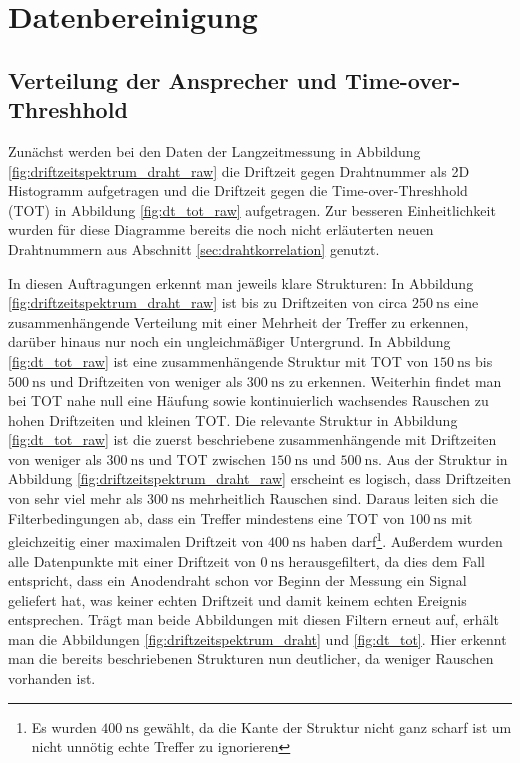 \chapter{Datenbereinigung}

\section{Verteilung der Ansprecher und Time-over-Threshhold}

Zunächst werden bei den Daten der Langzeitmessung in Abbildung \ref{fig:driftzeitspektrum_draht_raw} die Driftzeit gegen Drahtnummer als 2D Histogramm aufgetragen und die Driftzeit gegen die Time-over-Threshhold (TOT) in Abbildung \ref{fig:dt_tot_raw} aufgetragen. Zur besseren Einheitlichkeit wurden für diese Diagramme bereits die noch nicht erläuterten neuen Drahtnummern aus Abschnitt \ref{sec:drahtkorrelation} genutzt.

In diesen Auftragungen erkennt man jeweils klare Strukturen: In Abbildung \ref{fig:driftzeitspektrum_draht_raw} ist bis zu Driftzeiten von circa $\SI{250}{\nano\second}$ eine zusammenhängende Verteilung mit einer Mehrheit der Treffer zu erkennen, darüber hinaus nur noch ein ungleichmäßiger Untergrund. In Abbildung \ref{fig:dt_tot_raw} ist eine zusammenhängende Struktur mit TOT von $\SI{150}{\nano\second}$ bis $\SI{500}{\nano\second}$ und Driftzeiten von weniger als $\SI{300}{\nano\second}$ zu erkennen.
Weiterhin findet man bei TOT nahe null eine Häufung sowie kontinuierlich wachsendes Rauschen zu hohen Driftzeiten und kleinen TOT.
Die relevante Struktur in Abbildung \ref{fig:dt_tot_raw} ist die zuerst beschriebene zusammenhängende mit Driftzeiten von weniger als $\SI{300}{\nano\second}$ und TOT zwischen $\SI{150}{\nano\second}$ und $\SI{500}{\nano\second}$. Aus der Struktur in Abbildung \ref{fig:driftzeitspektrum_draht_raw} erscheint es logisch, dass Driftzeiten von sehr viel mehr als $\SI{300}{\nano\second}$ mehrheitlich Rauschen sind.
Daraus leiten sich die Filterbedingungen ab, dass ein Treffer mindestens eine TOT von $\SI{100}{\nano\second}$ mit gleichzeitig einer maximalen Driftzeit von $\SI{400}{\nano\second}$ haben darf\footnote{Es wurden $\SI{400}{\nano\second}$ gewählt, da die Kante der Struktur nicht ganz scharf ist um nicht unnötig echte Treffer zu ignorieren}. Außerdem wurden alle Datenpunkte mit einer Driftzeit von $\SI{0}{\nano\s}$ herausgefiltert, da dies dem Fall entspricht, dass ein Anodendraht schon vor Beginn der Messung ein Signal geliefert hat, was keiner echten Driftzeit und damit keinem echten Ereignis entsprechen.
Trägt man beide Abbildungen mit diesen Filtern erneut auf, erhält man die Abbildungen \ref{fig:driftzeitspektrum_draht} und \ref{fig:dt_tot}. Hier erkennt man die bereits beschriebenen Strukturen nun deutlicher, da weniger Rauschen vorhanden ist.

